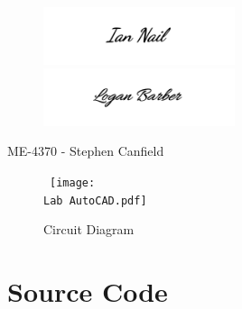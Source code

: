\documentclass[a4paper,12pt]{article} %
\begin{document}
\maketitle %
\vspace{3cm}

\begin{figure}[h!]
\centering
    \includegraphics[width=0.5\textwidth]{IANsignature.png}
    \includegraphics[width=0.5\textwidth]{LOGANsignature.png}
  \end{figure}
\begin{center}
\vspace{3cm}
ME-4370 - Stephen Canfield
\end{center}
\pagebreak



\begin{figure}[h!]
\center
\
    \texttt{[image: \\Lab AutoCAD.pdf]}
    \caption{Circuit Diagram}
  \end{figure}



\clearpage
\section{Source Code} %
\vspace{5mm}
\linespread{1}

\linespread{1.6}
\vspace{5mm}
\end{document}
